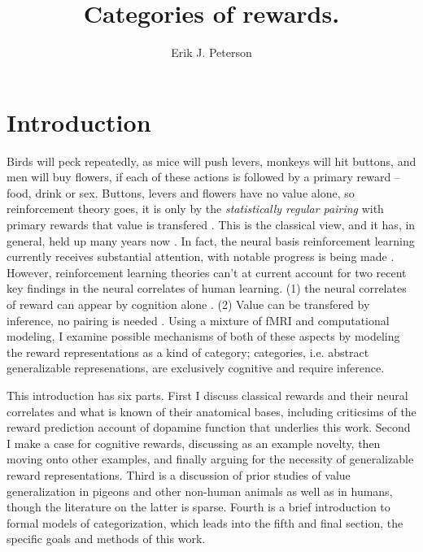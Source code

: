 \documentclass[doc,12pt]{apa}        %
\title{Categories of rewards.}
\author{Erik J. Peterson} \affiliation{Dept. of Psychology \\ Colorado State University \\ Fort Collins, CO}
\begin{document}
 
\maketitle
\doublespacing

\section{Introduction} %
\label{sec:introduction}
Birds will peck repeatedly, as mice will push levers, monkeys will hit buttons, and men will buy flowers, if each of these actions is followed by a primary reward -- food, drink or sex.  Buttons, levers and flowers have no value alone, so reinforcement theory goes, it is only by the \emph{statistically regular pairing} with primary rewards that value is transfered \cite{Rescorla:1988p8743}.  This is the classical view, and it has, in general, held up many years now \cite{iversen:2007aa}.  In fact, the neural basis reinforcement learning currently receives substantial attention, with notable progress is being made \cite{Glimcher:2011p8464, Montague:2006mz}.  However, reinforcement learning theories can't at current account for two recent key findings in the neural correlates of human learning. (1) the neural correlates of reward can appear by cognition alone \cite{Hayden:2009p6545, Lohrenz:2007p7240, Tricomi:2008p6663, Jimura:2010p8305}. (2) Value can be transfered by inference, no pairing is needed \cite{BrombergMartin:2010p7223, Hampton:2006p2577}. Using a mixture of fMRI and computational modeling, I examine possible mechanisms of both of these aspects by modeling the reward representations as a kind of category; categories, i.e. abstract generalizable represenations, are exclusively cognitive and require inference.

This introduction has six parts.  First I discuss classical rewards and their neural correlates and what is known of their anatomical bases, including criticsims of the reward prediction account of dopamine function that underlies this work.  Second I make a case for cognitive rewards, discussing as an example novelty, then moving onto other examples, and finally arguing for the necessity of generalizable reward representations.  Third is a discussion of prior studies of value generalization in pigeons and other non-human animals as well as in humans, though the literature on the latter is sparse.  Fourth is a brief introduction to formal models of categorization, which leads into the fifth and final section, the specific goals and methods of this work.
\end{document}
